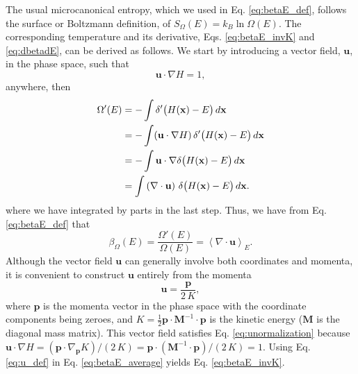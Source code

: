\documentclass[reprint]{revtex4-1}
\begin{document}
The usual microcanonical entropy,
which we used in Eq. \eqref{eq:betaE_def},
follows the surface or Boltzmann definition\cite{
  pearson1985, cagin1988, becker, dunkel2014, frenkel2015},
of $S_\Omega(E) = k_B \ln \Omega(E)$.
%
The corresponding temperature and its derivative,
Eqs. \eqref{eq:betaE_invK} and \eqref{eq:dbetadE},
can be derived as follows.
%
We start by introducing a vector field, $\mathbf u$,
in the phase space,
such that
%
\begin{equation}
  \mathbf u \cdot \nabla H = 1
  ,
  \label{eq:unormalization}
\end{equation}
%
anywhere, then
%
\begin{align}
  \Omega'(E)
  &= -\int \delta'\bigl( H(\mathbf x) - E \bigr) \, d\mathbf x
     \notag \\
  &= -\int (\mathbf u \cdot \nabla H) \,
           \delta'\bigl( H(\mathbf x) - E \bigr) \, d\mathbf x
     \notag \\
  &= -\int \mathbf u \cdot
           \nabla \delta\bigl( H(\mathbf x) - E \bigr) \, d\mathbf x
     \notag \\
  &= \int
     \left( \nabla \cdot \mathbf u \right) \,
     \delta\bigl( H(\mathbf x) - E \bigr) \, d\mathbf x
  .
  \notag
\end{align}
%
where we have integrated by parts in the last step.
%
Thus, we have from Eq. \eqref{eq:betaE_def} that
%
\begin{equation}
  \beta_\Omega(E)
  =
  \frac{ \Omega'(E) } { \Omega(E) }
  =
  \left\langle
    \nabla \cdot \mathbf u
  \right\rangle_E
  .
  \label{eq:betaE_average}
\end{equation}
%
Although the vector field $\mathbf u$ can generally
involve both coordinates and momenta,
it is convenient to construct $\mathbf u$
entirely from the momenta
%
\begin{equation}
  \mathbf u
  =
  \frac{ \mathbf p }
       {  2 \, K }
  ,
  \label{eq:u_def}
\end{equation}
where $\mathbf p$ is the momenta vector in the phase space
with the coordinate components being zeroes,
and $K = \frac 1 2 \mathbf p \cdot \mathbf M^{-1} \cdot \mathbf p$
is the kinetic energy ($\mathbf M$ is the diagonal mass matrix).
%
This vector field satisfies Eq. \eqref{eq:unormalization}
because
$\mathbf u \cdot \nabla H
= (\mathbf p \cdot \nabla_{\mathbf p} K)/(2 \, K)
= \mathbf p \cdot (\mathbf M^{-1} \cdot \mathbf p) / (2 \, K) = 1$.
%
Using Eq. \eqref{eq:u_def} in Eq. \eqref{eq:betaE_average}
yields Eq. \eqref{eq:betaE_invK}.
\end{document}
